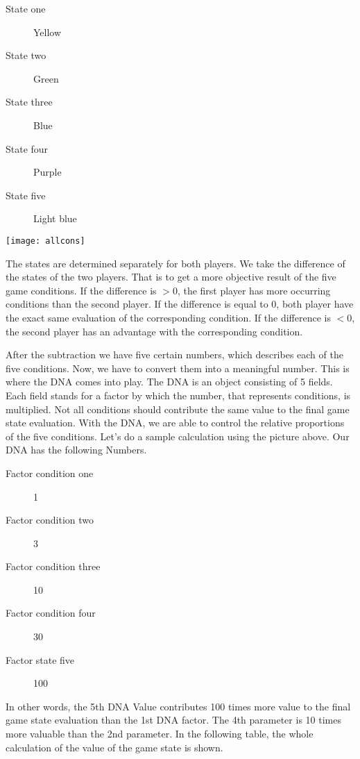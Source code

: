 \begin{description}
\item[State one] Yellow
\item[State two] Green
\item[State three] Blue
\item[State four] Purple
\item[State five] Light blue
\end{description}
\begin{fixedpic}
	\centering
	\texttt{[image: allcons]}
\end{fixedpic}
The states are determined separately for both players. We take the difference of the states of the two players. That is to get a more objective result of the five game conditions. If the difference is $>0$, the first player has more occurring conditions than the second player. If the difference is equal to $0$, both player have the exact same evaluation of the corresponding condition.
If the difference is $<0$, the second player has an advantage with the corresponding condition.

After the subtraction we have five certain numbers, which describes each of the five conditions.  Now, we have to convert them into a meaningful number. This is where the DNA comes into play. The DNA is an object consisting of 5 fields. Each field stands for a factor by which the number, that represents  conditions, is multiplied. Not all conditions should contribute the same value to the final game state evaluation. With the DNA, we are able to control the relative proportions of the five conditions. Let's do a sample calculation using the picture above. Our DNA has the following Numbers.
\begin{center}
\begin{description}
\item[Factor condition one] 1
\item[Factor condition two] 3
\item[Factor condition three] 10
\item[Factor condition four] 30
\item[Factor state five] 100
\end{description}
\end{center}


In other words, the 5th DNA Value contributes 100 times more value to the final game state evaluation than the 1st DNA factor. The 4th parameter is 10 times more valuable than the 2nd parameter. In the following table, the whole calculation of the value of the game state is shown.

